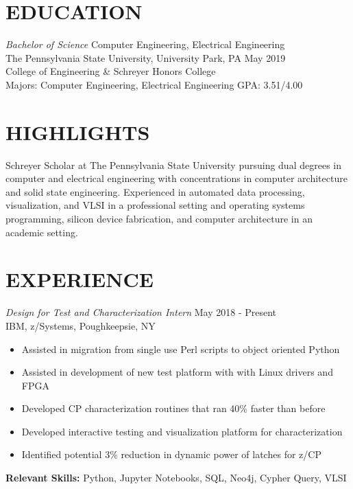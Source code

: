 \documentclass[line,margin]{res}
\begin{document}
	\address{235 S. Buckhout St. State College, PA 16801}
	\address{Cellphone: (484) 904-2099}
	
	\begin{resume}
		
		\section{EDUCATION}{\sl Bachelor of Science} Computer Engineering, Electrical Engineering \\
		The Pennsylvania State University, University Park, PA \hfill May 2019\\
		College of Engineering \& Schreyer Honors College\\
		Majors: Computer Engineering, Electrical Engineering \hfill GPA: 3.51/4.00

		\section{HIGHLIGHTS} Schreyer Scholar at The Pennsylvania State University pursuing dual degrees in computer and electrical engineering with concentrations in computer architecture and solid state engineering.  Experienced in automated data processing, visualization, and VLSI in a professional setting and operating systems programming, silicon device fabrication, and computer architecture in an academic setting. 
		
		\section{EXPERIENCE}{\sl Design for Test and Characterization Intern} \hfill May 2018 - Present\\
		IBM, z/Systems, Poughkeepsie, NY
		\begin{itemize}  \itemsep -2pt
			\item Assisted in migration from single use Perl scripts to object oriented Python
			\item Assisted in development of new test platform with with Linux drivers and FPGA
			\item Developed CP characterization routines that ran 40\% faster than before
			\item Developed interactive testing and visualization platform for characterization
			\item Identified potential 3\% reduction in dynamic power of latches for z/CP
			\vspace*{-\baselineskip}		
		\end{itemize}
		\textbf{Relevant Skills:} Python, Jupyter Notebooks, SQL, Neo4j, Cypher Query, VLSI
		

\end{resume}
\end{document}
